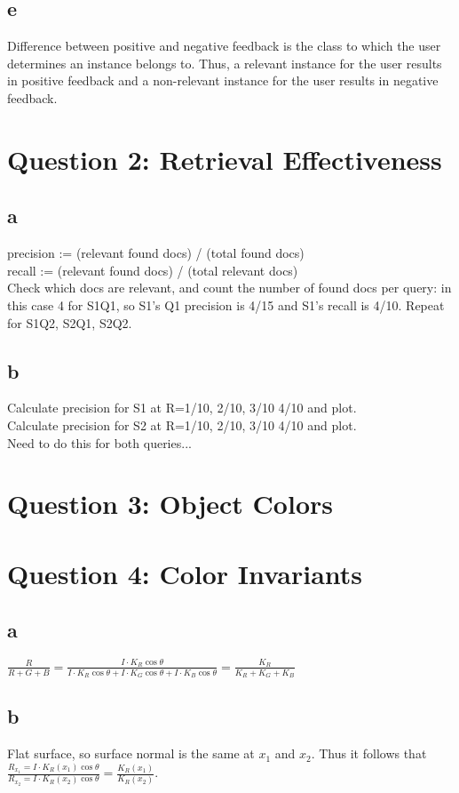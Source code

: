 \documentclass[a4paper,11pt]{article}
\newcommand{\ds}{\displaystyle}
\begin{document}
	\subsection*{e}
		Difference between positive and negative feedback is the class to which the user
		determines an instance belongs to. Thus, a relevant instance for the user results
		in positive feedback and a non-relevant instance  for the user results in negative
		feedback.

	\section*{Question 2: Retrieval Effectiveness}
		\subsection*{a}
			precision := (relevant found docs) / (total found docs)\\
			recall := (relevant found docs) / (total relevant docs)\\
			Check which docs are relevant, and count the number of found docs per query: in
			this case 4 for S1Q1, so S1's Q1 precision is 4/15 and S1's recall is 4/10. Repeat
			for S1Q2, S2Q1, S2Q2.
		\subsection*{b}
			Calculate precision for S1 at R=1/10, 2/10, 3/10 4/10 and plot.\\
			Calculate precision for S2 at R=1/10, 2/10, 3/10 4/10 and plot.\\
			Need to do this for both queries...

	\section*{Question 3: Object Colors}

	\section*{Question 4: Color Invariants}
	\subsection*{a}
		$\ds\frac{R}{R + G + B} = \ds\frac{I \cdot K_R \cos \theta}{I \cdot K_R \cos \theta + I \cdot K_G \cos \theta + I \cdot K_B \cos \theta} = \ds\frac{K_R}{K_R + K_G + K_B}$
	\subsection*{b}
		Flat surface, so surface normal is the same at $x_1$ and $x_2$. Thus it follows that
		$\ds\frac{R_{x_1} = I \cdot K_R(x_1) \cos \theta}{R_{x_2} = I \cdot K_R(x_2) \cos \theta} = \ds\frac{K_R(x_1)}{K_R(x_2)}$.
\end{document}
